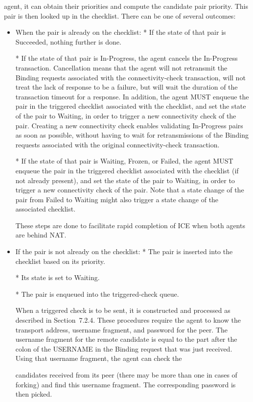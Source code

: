 \documentclass{article}
\begin{document}
agent, it can obtain their priorities and compute the candidate pair priority.  This pair is then looked up in the checklist.  There can be one of several outcomes:

\begin{itemize}
\item When the pair is already on the checklist:
*  If the state of that pair is Succeeded, nothing further is done.

*  If the state of that pair is In-Progress, the agent cancels the In-Progress transaction.  Cancellation means that the agent will not retransmit the Binding requests associated with the connectivity-check transaction, will not treat the lack of response to be a failure, but will wait the duration of the transaction timeout for a response.  In addition, the agent MUST enqueue the pair in the triggered checklist associated with the checklist, and set the state of the pair to Waiting, in order to trigger a new connectivity check of the pair. Creating a new connectivity check enables validating In-Progress pairs as soon as possible, without having to wait for retransmissions of the Binding requests associated with the original connectivity-check transaction.

*  If the state of that pair is Waiting, Frozen, or Failed, the agent MUST enqueue the pair in the triggered checklist associated with the checklist (if not already present), and set the state of the pair to Waiting, in order to trigger a new connectivity check of the pair.  Note that a state change of the pair from Failed to Waiting might also trigger a state change of the associated checklist.

These steps are done to facilitate rapid completion of ICE when both agents are behind NAT.

\item If the pair is not already on the checklist:
*  The pair is inserted into the checklist based on its priority.

*  Its state is set to Waiting.

*  The pair is enqueued into the triggered-check queue.

When a triggered check is to be sent, it is constructed and processed as described in Section~7.2.4.  These procedures require the agent to know the transport address, username fragment, and password for the peer.  The username fragment for the remote candidate is equal to the part after the colon of the USERNAME in the Binding request that was just received.  Using that username fragment, the agent can check the

candidates received from its peer (there may be more than one in cases of forking) and find this username fragment.  The corresponding password is then picked.

\end{itemize}
\end{document}
